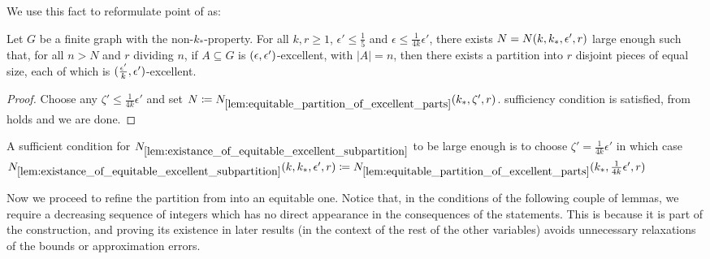     We use this fact to reformulate point  of
     as:

    \begin{lemma}[Claim 5.13.2(3)] \label{lem:existance_of_equitable_excellent_subpartition}
        Let $G$ be a finite graph with the non-$k_*$-property.
        For all $k, r \geq 1$, $\epsilon' \leq \frac{1}{5}$ and $\epsilon \leq \frac{1}{4k} \epsilon'$, there exists
        $N = N( k, k_*, \epsilon', r )$ large enough such that, for all $n > N$ and $r$ dividing $n$,
        if $A \subseteq G$ is $( \epsilon, \epsilon' )$-excellent, with $|A| = n$, then there exists a
        partition into $r$ disjoint pieces of equal size, each of which is $( \frac{\epsilon'}{k}, \epsilon' )$-excellent.
        \begin{proof}
            Choose any $\zeta' \leq \frac{1}{4k} \epsilon'$ and set $N \coloneqq N_{\ref{lem:equitable_partition_of_excellent_parts}}( k_*, \zeta', r )$.
             sufficiency condition is satisfied,
             from 
            holds and we are done.
        \end{proof}
    \end{lemma}

    \begin{remark}
        A sufficient condition for $N_{\ref{lem:existance_of_equitable_excellent_subpartition}}$ to be large enough is
        to choose $\zeta' = \frac{1}{4k} \epsilon'$ in which case
        $N_{\ref{lem:existance_of_equitable_excellent_subpartition}}( k, k_*, \epsilon', r ) \coloneqq
        N_{\ref{lem:equitable_partition_of_excellent_parts}}( k_*, \frac{1}{4k} \epsilon', r )$
    \end{remark}

    Now we proceed to refine the partition from  into an equitable one.
    Notice that, in the conditions of the following couple of lemmas, we require a decreasing sequence of integers which
    has no direct appearance in the consequences of the statements.
    This is because it is part of the construction, and proving its existence in later results (in the context of the
    rest of the other variables) avoids unnecessary relaxations of the bounds or approximation errors.

